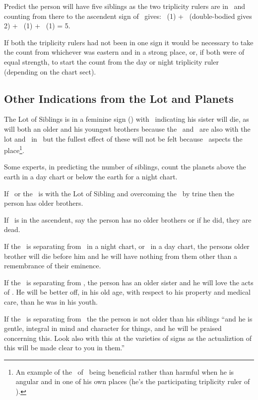 Predict the person will have five siblings as the two triplicity rulers are in \Taurus\, and counting from there to the ascendent sign of \Leo\, gives: \Taurus\, (1) + \Gemini\, (double-bodied gives 2) + \Cancer\, (1) + \Leo\, (1) = 5.

If both the triplicity rulers had not been in one sign it would be necessary to take the count from whichever was eastern and in a strong place, or, if both were of equal strength, to start the count from the day or night triplicity ruler (depending on the chart sect). 

\subsection{Other Indications from the Lot and Planets}
The Lot of Siblings is in a feminine sign (\Taurus) with \Saturn\, indicating his sister will die, as will both an older and his youngest brothers because the \Sun\, and \Mercury\, are also with the lot and \Saturn\, in \Taurus\, but the fullest effect of these will not be felt because \Jupiter\, aspects the place\footnote{An example of the \Square\, of \Jupiter\, being beneficial rather than harmful when he is angular and in one of his own places (he's the participating triplicity ruler of \Aquarius).}.

Some experts, in predicting the number of siblings, count the planets above the earth in a day chart or below the earth for a night chart. 

If \Jupiter\, or the \Sun\, is with the Lot of Sibling and overcoming the \Moon\, by trine then the person has older brothers.

If \Mercury\, is in the ascendent, say the person has no older brothers or if he did, they are dead.

If the \Moon\, is separating from \Saturn\, in a night chart,  or \Mars\, in a day chart, the persons older brother will die before him and he will have nothing from them other than a remembrance of their eminence.

If the \Moon\, is separating from \Venus, the person has an older sister and he will love the acts of \Venus. He will be better off, in his old age, with respect to his property and medical care,  than he was in his youth.

If the \Moon\, is separating from \Mercury\, the the person is not older than his siblings ``and he is gentle, integral in mind and character for things, and he will be praised concerning this. Look also with this at the varieties of signs as the actualiztion of this will be made clear to you in them.''

